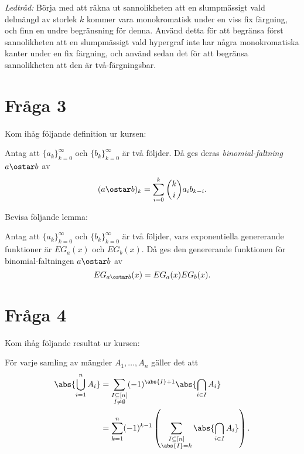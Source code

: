 \documentclass[nobib]{tufte-handout}
\begin{document}
\emph{Ledtråd:} Börja med att räkna ut sannolikheten att en slumpmässigt vald delmängd av storlek $k$ kommer vara monokromatisk under en viss fix färgning, och finn en undre begränsning för denna. Använd detta för att begränsa först sannolikheten att en slumpmässigt vald hypergraf inte har några monokromatiska kanter under en fix färgning, och använd sedan det för att begränsa sannolikheten att den är två-färgningsbar.

\section{Fråga 3} %
Kom ihåg följande definition ur kursen:
\begin{definition}
  Antag att $\{a_k\}_{k=0}^\infty$ och $\{b_k\}_{k=0}^\infty$ är två följder. Då ges deras \emph{binomial-faltning} $a \ostar b$ av
  $$(a \ostar b)_k = \sum_{i=0}^{k} \binom{k}{i} a_i b_{k-i}.$$
\end{definition}

Bevisa följande lemma:
\begin{lemma}
  Antag att $\{a_k\}_{k=0}^\infty$ och $\{b_k\}_{k=0}^\infty$ är två följder, vars exponentiella genererande funktioner är $EG_a(x)$ och $EG_b(x)$. Då ges den genererande funktionen för binomial-faltningen $a \ostar b$ av
  $$EG_{a \ostar b}(x) = EG_a(x)EG_b(x).$$
\end{lemma}

\section{Fråga 4} %
Kom ihåg följande resultat ur kursen:
\begin{theorem}\label{theorem_inclusion_exclusion}
  För varje samling av mängder $A_1, \ldots, A_n$ gäller det att
  \begin{align*}
    \abs{\bigcup_{i=1}^n A_i} &= \sum_{\substack{I \subseteq [n]\\I\neq\emptyset}} (-1)^{\abs{I}+1}\abs{\bigcap_{i \in I} A_i}\\
    &=\sum_{k=1}^{n} (-1)^{k-1}\left(\sum_{\substack{I \subseteq [n]\\\abs{I} = k}} \abs{\bigcap_{i \in I} A_i}\right).
  \end{align*}
\end{theorem}
\end{document}
